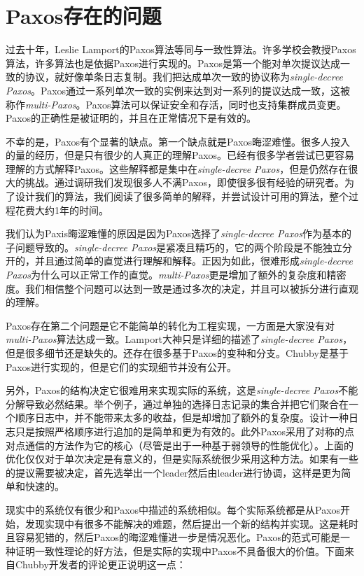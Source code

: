 \documentclass[journal]{IEEEtran}
\begin{document}
\section{Paxos存在的问题}
过去十年，Leslie Lamport的Paxos算法等同与一致性算法。许多学校会教授Paxos算法，许多算法也是依据Paxos进行实现的。Paxos是第一个能对单次提议达成一致的协议，就好像单条日志复制。我们把达成单次一致的协议称为\textit{single-decree Paxos}。Paxos通过一系列单次一致的实例来达到对一系列的提议达成一致，这被称作\textit{multi-Paxos}。Paxos算法可以保证安全和存活，同时也支持集群成员变更。Paxos的正确性是被证明的，并且在正常情况下是有效的。


不幸的是，Paxos有个显著的缺点。第一个缺点就是Paxos晦涩难懂。很多人投入的量的经历，但是只有很少的人真正的理解Paxos。已经有很多学者尝试已更容易理解的方式解释Paxos。这些解释都是集中在\textit{single-decree Paxos}，但是仍然存在很大的挑战。通过调研我们发现很多人不满Paxos，即使很多很有经验的研究者。为了设计我们的算法，我们阅读了很多简单的解释，并尝试设计可用的算法，整个过程花费大约1年的时间。


我们认为Paxis晦涩难懂的原因是因为Paxos选择了\textit{single-decree Paxos}作为基本的子问题导致的。\textit{single-decree Paxos}是紧凑且精巧的，它的两个阶段是不能独立分开的，并且通过简单的直觉进行理解和解释。正因为如此，很难形成\textit{single-decree Paxos}为什么可以正常工作的直觉。\textit{multi-Paxos}更是增加了额外的复杂度和精密度。我们相信整个问题可以达到一致是通过多次的决定，并且可以被拆分进行直观的理解。


Paxos存在第二个问题是它不能简单的转化为工程实现，一方面是大家没有对\textit{multi-Paxos}算法达成一致。Lamport大神只是详细的描述了\textit{single-decree Paxos}，但是很多细节还是缺失的。还存在很多基于Paxos的变种和分支。Chubby是基于Paxos进行实现的，但是它们的实现细节并没有公开。


另外，Paxos的结构决定它很难用来实现实际的系统，这是\textit{single-decree Paxos}不能分解导致必然结果。举个例子，通过单独的选择日志记录的集合并把它们聚合在一个顺序日志中，并不能带来太多的收益，但是却增加了额外的复杂度。设计一种日志只是按照严格顺序进行追加的是简单和更为有效的。此外Paxos采用了对称的点对点通信的方法作为它的核心（尽管是出于一种基于弱领导的性能优化）。上面的优化仅仅对于单次决定是有意义的，但是实际系统很少采用这种方法。如果有一些的提议需要被决定，首先选举出一个leader然后由leader进行协调，这样是更为简单和快速的。


现实中的系统仅有很少和Paxos中描述的系统相似。每个实际系统都是从Paxos开始，发现实现中有很多不能解决的难题，然后提出一个新的结构并实现。这是耗时且容易犯错的，然后Paxos的晦涩难懂进一步是情况恶化。Paxos的范式可能是一种证明一致性理论的好方法，但是实际的实现中Paxos不具备很大的价值。下面来自Chubby开发者的评论更正说明这一点：
\end{document}
